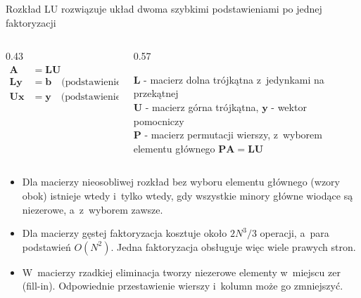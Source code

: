 \begin{frame}{Rozkład LU rozwiązuje układ dwoma szybkimi podstawieniami po jednej faktoryzacji}
  \tightdisplays
  \begin{columns}[c]
    \begin{column}{0.43\textwidth}
      \begin{align*}
        \mathbf{A} &= \mathbf{L}\mathbf{U} \\
        \mathbf{L}\mathbf{y} &= \mathbf{b} \quad \text{(podstawienie w przód)} \\
        \mathbf{U}\mathbf{x} &= \mathbf{y} \quad \text{(podstawienie wstecz)}
      \end{align*}
    \end{column}
    \begin{column}{0.57\textwidth}
      \vspace{1mm}
      {\footnotesize
      $\mathbf{L}$ - macierz dolna trójkątna z~jedynkami na przekątnej\\
      $\mathbf{U}$ - macierz górna trójkątna, $\mathbf{y}$ - wektor pomocniczy\\
      $\mathbf{P}$ - macierz permutacji wierszy, z~wyborem elementu głównego $\mathbf{P}\mathbf{A} = \mathbf{L}\mathbf{U}$\par}
    \end{column}
  \end{columns}
  \begin{itemize}
    \item Dla macierzy nieosobliwej rozkład bez wyboru elementu głównego (wzory obok) istnieje wtedy i~tylko wtedy, gdy wszystkie minory główne wiodące są niezerowe, a~z~wyborem zawsze.
    \item Dla macierzy gęstej faktoryzacja kosztuje około $2N^3/3$ operacji, a~para podstawień $O(N^2)$. Jedna faktoryzacja obsługuje więc wiele prawych stron.
    \item W~macierzy rzadkiej eliminacja tworzy niezerowe elementy w~miejscu zer (fill-in). Odpowiednie przestawienie wierszy i~kolumn może go zmniejszyć.
  \end{itemize}
\end{frame}

